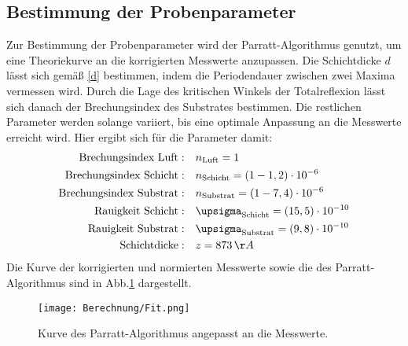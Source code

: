 \subsection{Bestimmung der Probenparameter}
Zur Bestimmung der Probenparameter wird der Parratt-Algorithmus genutzt, um eine Theoriekurve an die  korrigierten Messwerte anzupassen. Die Schichtdicke $d$ lässt sich gemäß \eqref{d} bestimmen, indem die Periodendauer zwischen zwei Maxima vermessen wird. Durch die Lage des kritischen Winkels der Totalreflexion lässt sich danach der Brechungsindex des Substrates bestimmen. Die restlichen Parameter werden solange variiert, bis eine optimale Anpassung an die Messwerte erreicht wird. Hier ergibt sich für die Parameter damit:
\begin{align}
  \text{Brechungsindex Luft}:&\quad n_\text{Luft}=1\\
  \text{Brechungsindex Schicht}:&\quad n_\text{Schicht}= \left(1-1,2\right)\cdot10^{-6}\\
  \text{Brechungsindex Substrat}:&\quad n_\text{Substrat}=\left(1-7,4\right)\cdot10^{-6}\\
  \text{Rauigkeit Schicht}:&\quad \upsigma_\text{Schicht}=\left(15,5\right)\cdot10^{-10}\\
  \text{Rauigkeit Substrat}:&\quad \upsigma_\text{Substrat}=\left(9,8\right)\cdot10^{-10}\\
  \text{Schichtdicke}:&\quad z=873\,\AA
\end{align}
Die Kurve der korrigierten und normierten Messwerte sowie die des Parratt-Algorithmus sind in Abb.\ref{fit} dargestellt.
\begin{figure}[H]
  \centering
  \texttt{[image: Berechnung/Fit.png]}
  \caption{Kurve des Parratt-Algorithmus angepasst an die Messwerte.}
  \label{fit}
\end{figure}
